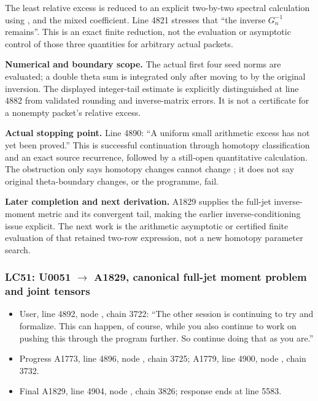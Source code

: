 \documentclass[10pt,a4paper,oneside]{report}
\providecommand{\tightlist}{\setlength{\itemsep}{0pt}\setlength{\parskip}{0pt}}
\begin{document}
The least relative excess is reduced to an explicit two-by-two spectral
calculation using \protect{},
\protect{} and the mixed coefficient. Line
4821 stresses that ``the inverse \(G_n^{-1}\) remains''. This is an
exact finite reduction, not the evaluation or asymptotic control of
those three quantities for arbitrary actual packets.

\textbf{Numerical and boundary scope.} The actual first four seed norms
are evaluated; a double theta sum is integrated only after moving
\protect{} to \protect{} by the original
inversion. The displayed integer-tail estimate is explicitly
distinguished at line 4882 from validated rounding and inverse-matrix
errors. It is not a certificate for a nonempty packet's relative excess.

\textbf{Actual stopping point.} Line 4890: ``A uniform small arithmetic
excess has not yet been proved.'' This is successful continuation
through homotopy classification and an exact source recurrence, followed
by a still-open quantitative calculation. The obstruction only says
homotopy changes cannot change \protect{}; it does not say
original theta-boundary changes, or the programme, fail.

\textbf{Later completion and next derivation.} A1829 supplies the
full-jet inverse-moment metric and its convergent tail, making the
earlier inverse-conditioning issue explicit. The next work is the
arithmetic asymptotic or certified finite evaluation of that retained
two-row expression, not a new homotopy parameter search.

\subsubsection{\texorpdfstring{LC51: U0051
\allowbreak{}\ensuremath{→}\allowbreak{} A1829, canonical full-jet
moment problem and joint
tensors}{LC51: U0051  A1829, canonical full-jet moment problem and joint tensors}}\label{lc51-u0051-a1829-canonical-full-jet-moment-problem-and-joint-tensors}

\begin{itemize}
\tightlist
\item
  User, line 4892, node
  \protect{}, chain 3722: ``The
  other session is continuing to try and formalize. This can happen, of
  course, while you also continue to work on pushing this through the
  program further. So continue doing that as you are.''
\item
  Progress A1773, line 4896, node
  \protect{}, chain 3725;
  A1779, line 4900, node
  \protect{}, chain 3732.
\item
  Final A1829, line 4904, node
  \protect{}, chain 3826;
  response ends at line 5583.
\end{itemize}
\end{document}
